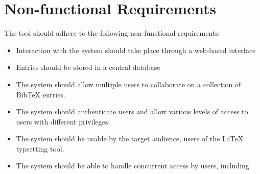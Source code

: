 \documentclass{l3proj}
\begin{document}
\section*{Non-functional Requirements}
The tool should adhere to the following non-functional requirements:
\begin{itemize}
\item Interaction with the system should take place through a web-based interface
\item Entries should be stored in a central database
\item The system should allow multiple users to collaborate on a collection of BibTeX entries.
\item The system should authenticate users and allow various levels of access to users with different privileges.
\item The system should be usable by the target audience, users of the LaTeX typsetting tool.
\item The system should be able to handle concurrent access by users, including 
\end{itemize}

































\end{document}
